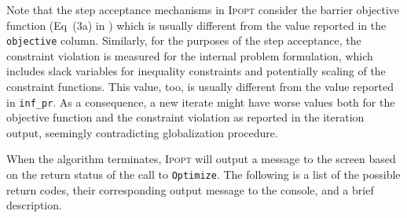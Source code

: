 \documentclass[10pt]{article}
\newcommand{\Ipopt}{\textsc{Ipopt}\xspace}
\begin{document}
Note that the step acceptance mechanisms in \Ipopt consider the
barrier objective function (Eq~(3a) in \cite{WaecBieg06:mp}) which is
usually different from the value reported in the \texttt{objective}
column.  Similarly, for the purposes of the step acceptance, the
constraint violation is measured for the internal problem formulation,
which includes slack variables for inequality constraints and
potentially scaling of the constraint functions.  This value, too, is
usually different from the value reported in \texttt{inf\_pr}.  As a
consequence, a new iterate might have worse values both for the
objective function and the constraint violation as reported in the
iteration output, seemingly contradicting globalization procedure.

When the algorithm terminates, \Ipopt will output a message to the
screen based on the return status of the call to {\tt Optimize}. The following
is a list of the possible return codes, their corresponding output message
to the console, and a brief description.
\end{document}
